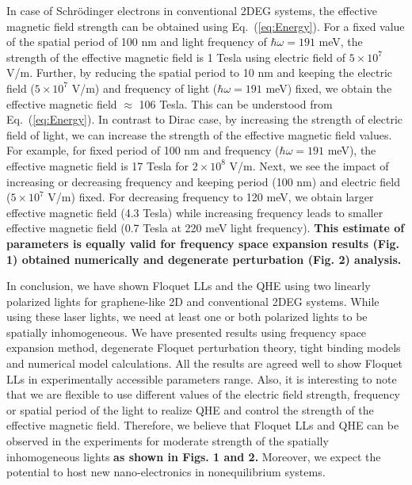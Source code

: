 In case of Schr\"{o}dinger electrons in conventional 2DEG systems, the effective magnetic field strength can be obtained using Eq.~(\ref{eq:Energy}). For a fixed value of the spatial period of 100 nm and light frequency of $\hbar \omega = 191$ meV, the strength of the effective magnetic field is 1 Tesla using electric field of $5 \times 10^7$ V/m. Further, by reducing the spatial period to 10 nm and keeping the electric field ($5 \times 10^7$ V/m) and frequency of light ($\hbar \omega = 191 $ meV) fixed, we obtain the effective magnetic field $\approx$ 106 Tesla. This can be understood from Eq.~(\ref{eq:Energy}). In contrast to Dirac case, by increasing the strength of electric field of light, we can increase the strength of the effective magnetic field values. For example, for fixed period of 100 nm and frequency ($\hbar \omega = 191 $ meV), the effective magnetic field is 17 Tesla for $2 \times 10^8$ V/m. Next, we see the impact of increasing or decreasing frequency and keeping period (100 nm) and electric field ($5 \times 10^7$ V/m) fixed. For decreasing frequency to 120 meV, we obtain larger effective magnetic field (4.3 Tesla) while increasing frequency leads to smaller effective magnetic field (0.7 Tesla at 220 meV light frequency). \textbf{This estimate of parameters is equally valid for frequency space expansion results (Fig. 1) obtained numerically and degenerate perturbation (Fig. 2) analysis.}

In conclusion, we have shown Floquet LLs and the QHE using two linearly polarized lights for graphene-like 2D and conventional 2DEG systems. While using these laser lights, we  need at least one or both polarized lights to be spatially inhomogeneous. We have presented results using frequency space expansion method, degenerate Floquet perturbation theory, tight binding models and numerical model calculations. All the results are agreed well to show Floquet LLs in experimentally accessible parameters range. Also, it is interesting to note that we are flexible to use different values of the electric field strength, frequency or spatial period of the light to realize QHE and control the strength of the effective magnetic field. Therefore, we believe that Floquet LLs and QHE can be observed in the experiments for moderate strength of the spatially inhomogeneous lights \textbf{as shown in Figs. 1 and 2.} Moreover, we expect the potential to host new nano-electronics in nonequilibrium systems.

